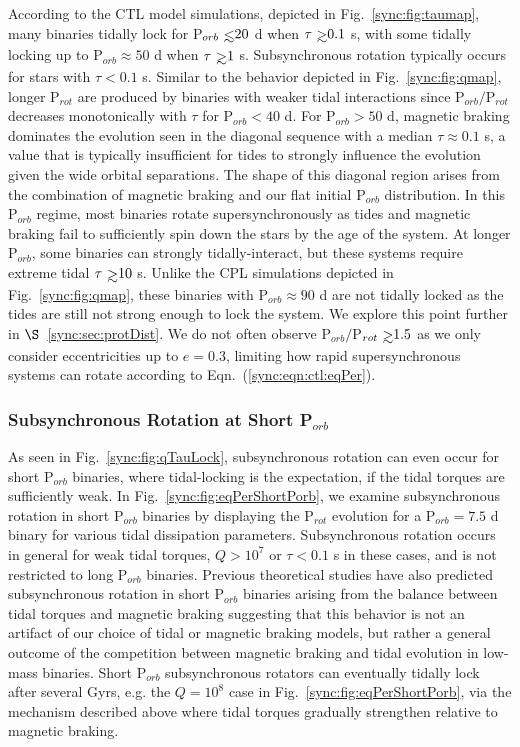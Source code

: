 According to the CTL model simulations, depicted in Fig.~\ref{sync:fig:taumap}, many binaries tidally lock for P$_{orb} \lsim 20$ d when $\tau \gsim 0.1$ s, with some tidally locking up to P$_{orb} \approx 50$ d when $\tau \gsim 1$ s. Subsynchronous rotation typically occurs for stars with $\tau < 0.1$ s. Similar to the behavior depicted in Fig.~\ref{sync:fig:qmap}, longer P$_{rot}$ are produced by binaries with weaker tidal interactions since P$_{orb}/$P$_{rot}$ decreases monotonically with $\tau$ for P$_{orb} < 40$ d.  For P$_{orb} > 50$ d, magnetic braking dominates the evolution seen in the diagonal sequence with a median $\tau \approx 0.1$ s, a value that is typically insufficient for tides to strongly influence the evolution given the wide orbital separations. The shape of this diagonal region arises from the combination of magnetic braking and our flat initial P$_{orb}$ distribution. In this P$_{orb}$ regime, most binaries rotate supersynchronously as tides and magnetic braking fail to sufficiently spin down the stars by the age of the system. At longer P$_{orb}$, some binaries can strongly tidally-interact, but these systems require extreme tidal $\tau \gsim 10$ s. Unlike the CPL simulations depicted in Fig.~\ref{sync:fig:qmap}, these binaries with P$_{orb} \approx 90$ d are not tidally locked as the tides are still not strong enough to lock the system. We explore this point further in $\S$~\ref{sync:sec:protDist}. We do not often observe P$_{orb}/$P$_{rot} \gsim 1.5$ as we only consider eccentricities up to $e = 0.3$, limiting how rapid supersynchronous systems can rotate according to Eqn.~(\ref{sync:eqn:ctl:eqPer}).


\subsubsection{Subsynchronous Rotation at Short P$_{orb}$} \label{sync:sec:shortPorbSubSync}

As seen in Fig.~\ref{sync:fig:qTauLock}, subsynchronous rotation can even occur for short P$_{orb}$ binaries, where tidal-locking is the expectation, if the tidal torques are sufficiently weak. In Fig.~\ref{sync:fig:eqPerShortPorb}, we examine subsynchronous rotation in short P$_{orb}$ binaries by displaying the P$_{rot}$ evolution for a P$_{orb} = 7.5$ d binary for various tidal dissipation parameters. Subsynchronous rotation occurs in general for weak tidal torques, $Q>10^7$ or $\tau < 0.1$ s in these cases, and is not restricted to long P$_{orb}$ binaries. Previous theoretical studies have also predicted subsynchronous rotation in short P$_{orb}$ binaries arising from the balance between tidal torques and magnetic braking \citep[e.g.][]{Habets1989,Zahn1994,Keppens1997} suggesting that this behavior is not an artifact of our choice of tidal or magnetic braking models, but rather a general outcome of the competition between magnetic braking and tidal evolution in low-mass binaries.  Short P$_{orb}$ subsynchronous rotators can eventually tidally lock after several Gyrs, e.g. the $Q=10^8$ case in Fig.~\ref{sync:fig:eqPerShortPorb}, via the mechanism described above where tidal torques gradually strengthen relative to magnetic braking. 


